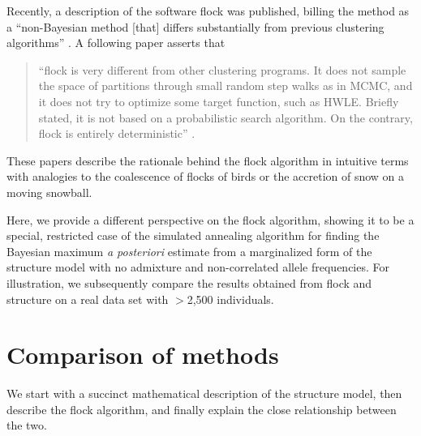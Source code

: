 Recently, a description of the software {\sc flock} was published, 
billing the method as a ``non-Bayesian method [that] 
differs substantially from previous 
clustering algorithms'' \citep[][p.~1333]{Duc&Tur2009}. A following
paper asserts that
\begin{quote}
``{\sc flock} is very different from  other clustering 
programs. It does not sample the space of partitions through small 
random step walks as in MCMC, and it does not try to optimize some 
target function, such as HWLE\@. Briefly stated, it is not based on a 
probabilistic search algorithm. On the contrary, {\sc flock} is 
entirely deterministic'' \citep[][p.~736]{Duc&Tur2012}.
\end{quote}
These papers describe the rationale behind the {\sc flock} algorithm in
intuitive terms with analogies to the coalescence of flocks of birds
or the accretion of snow on a moving snowball.  

Here, we provide a different perspective on the {\sc flock} algorithm,
showing it to be a special, restricted case of the simulated annealing
algorithm for finding the Bayesian maximum {\em a posteriori}
estimate from a marginalized form of the {\sc structure} model with no
admixture and non-correlated allele frequencies.  For illustration, we subsequently compare
the results obtained from {\sc flock} and {\sc structure} on a real data
set with $>$2,500 individuals.

\section*{Comparison of methods}
We start with a succinct mathematical description of the {\sc structure}
model, then describe the {\sc flock} algorithm, and finally explain
the close relationship between the two.


